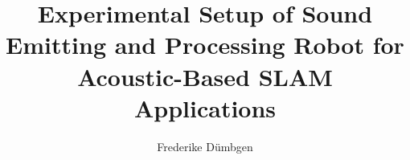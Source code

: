 \documentclass{flex}
\title{Experimental Setup of Sound Emitting and Processing Robot for Acoustic-Based SLAM Applications}
\author{Frederike Dümbgen}
\begin{document}
\maketitle




\newpage
\tableofcontents
\clearpage
\listoffigures
\listoftables










\newpage

{}
\end{document}
